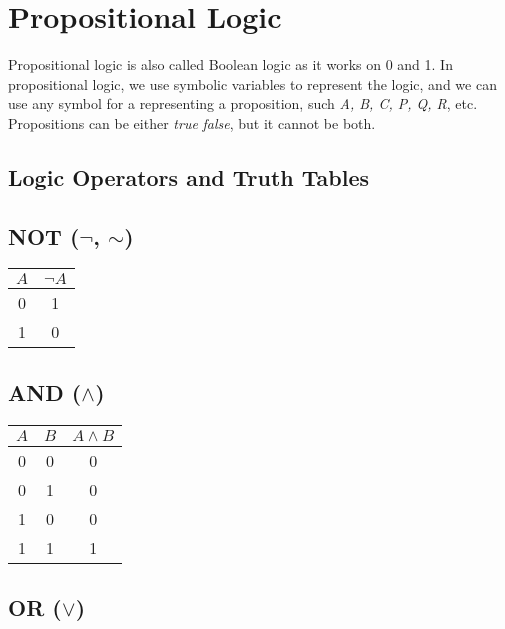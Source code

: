 \newpage
\section{Propositional Logic}

Propositional logic is also called Boolean logic as 
it works on 0 and 1. In propositional logic, we use symbolic variables to represent the 
logic, and we can use any symbol for a representing a proposition, such 
\emph{A, B, C, P, Q, R}, etc. Propositions can be either \emph{true} \emph{false}, but it cannot be both.

\subsection{Logic Operators and Truth Tables}
\smallskip
\begin{multicols}{2}

	\subsection*{NOT (\(\neg\), \(\sim\))}

	\begin{tabular}{cc}
		\toprule
		\(A\) & \(\neg A\) \\
		\midrule
		0   & 1        \\
		1   & 0        \\
		\bottomrule
	\end{tabular}

	\vspace{1em}

	\subsection*{AND (\(\land\))}

	\begin{tabular}{ccc}
		\toprule
		\(A\) & \(B\) & \(A \land B\) \\
		\midrule
		0   & 0   & 0           \\
		0   & 1   & 0           \\
		1   & 0   & 0           \\
		1   & 1   & 1           \\
		\bottomrule
	\end{tabular}

	\vspace{1em}

	\subsection*{OR (\(\lor\))}


\end{multicols}
